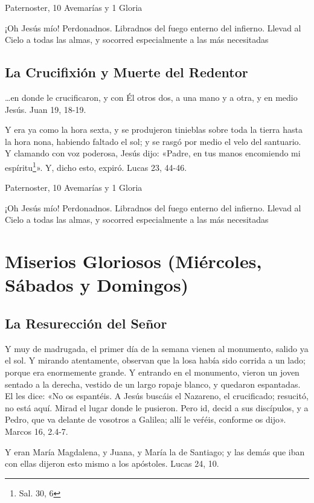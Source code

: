 \documentclass[a4paper,11pt, oneside]{report}
\begin{document}
        \medskip
         Paternoster, 10 Avemarías y 1 Gloria
        
        \medskip
        ¡Oh Jesús mío! Perdonadnos. Libradnos del fuego enterno del infierno. Llevad al Cielo a todas las almas, y socorred especialmente a las más 
        necesitadas
      
      \subsection*{La Crucifixión y Muerte del Redentor}
        {\ldots}en donde le crucificaron, y con Él otros dos, a una mano y a otra, y en medio Jesús. Juan 19, 18-19.

        \medskip
        Y era ya como la hora sexta, y se produjeron tinieblas sobre toda la tierra hasta la hora nona, habiendo faltado el sol; y se rasgó por medio 
        el velo del santuario. Y clamando con voz poderosa, Jesús dijo: «Padre, en tus manos encomiendo mi espíritu\footnote{Sal. 30, 6}». 
        Y, dicho esto, expiró. Lucas 23, 44-46.
        
         Paternoster, 10 Avemarías y 1 Gloria
        
        \medskip
        ¡Oh Jesús mío! Perdonadnos. Libradnos del fuego enterno del infierno. Llevad al Cielo a todas las almas, y socorred especialmente a las más 
        necesitadas
        
    \section*{Miserios Gloriosos (Miércoles, Sábados y Domingos)}
      \subsection*{La Resurección del Señor}
        Y muy de madrugada, el primer día de la semana vienen al monumento, salido ya el sol. Y mirando atentamente, observan que la losa había
        sido corrida a un lado; porque era enormemente grande. Y entrando en el monumento, vieron un joven sentado a la derecha, vestido de un largo
        ropaje blanco, y quedaron espantadas. El les dice: «No os espantéis. A Jesús buscáis el Nazareno, el crucificado; resucitó, no está aquí. Mirad
        el lugar donde le pusieron. Pero id, decid a sus discípulos, y a Pedro, que va delante de vosotros a Galilea; allí le veŕéis, conforme os dijo».
        Marcos 16, 2.4-7.

        \medskip
        Y eran María Magdalena, y Juana, y María la de Santiago; y las demás que iban con ellas dijeron esto mismo a los apóstoles. 
        Lucas 24, 10.
\end{document}

